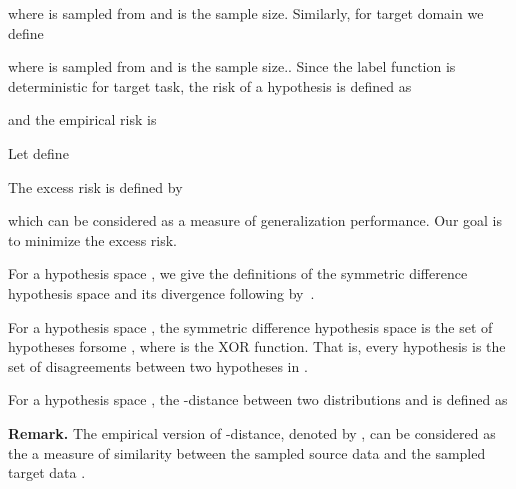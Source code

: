 \documentclass[10pt,twocolumn,letterpaper]{article}
\begin{document}
where  is sampled from  and  is the sample size.
Similarly, for target domain we define

where  is sampled from  and  is the sample size..
Since the label function is deterministic for target task, the risk of a hypothesis is defined as

and the empirical risk is 

Let define 

The excess risk is defined by

which can be considered as a measure of generalization performance. Our goal is to minimize the excess risk.

For a hypothesis space , we give the definitions of the symmetric difference hypothesis space  and its divergence following by~\cite{ben2010theory}.
\begin{definition}\cite{ben2010theory}\label{def:sym:hyp}
For a hypothesis space , the symmetric difference hypothesis space  is the set of hypotheses
 forsome ,
where  is the XOR function. That is, every hypothesis   is the set of disagreements between two hypotheses in .
\end{definition}
\begin{definition}\cite{ben2010theory}\label{def:sym:hyp:divergence}
 For a hypothesis space , the -distance between two distributions  and  is defined as

\end{definition}
{\bf Remark.} The empirical version of -distance, denoted by , can be considered as the a measure of similarity between the sampled source data  and the sampled target data .
\end{document}
